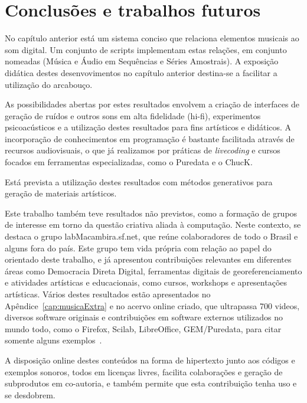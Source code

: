 \chapter{Conclusões e trabalhos futuros} %
\label{cap:conclusao}

No capítulo anterior está um sistema conciso
que relaciona elementos musicais ao som digital. Um conjunto
de scripts implementam estas relações, em conjunto nomeadas \massa (Música
e Áudio em Sequências e Séries Amostrais). 
A exposição didática destes desenvovimentos no
capítulo anterior destina-se a facilitar a utilização
do arcabouço.

As possibilidades abertas por estes resultados envolvem a criação de interfaces de geração de ruídos e outros sons em alta fidelidade (hi-fi), experimentos psicoacústicos e a utilização destes resultados para fins artísticos e didáticos. A incorporação de conhecimentos
em programação é bastante facilitada através de recursos audiovisuais, o que já realizamos por práticas de \emph{livecoding} e cursos focados em ferramentas especializadas, como o Puredata e o ChucK.

Está prevista a utilização destes resultados com
métodos generativos para geração de materiais artísticos.


Este trabalho também teve resultados não previstos, como a formação de grupos
de interesse em torno da questão criativa aliada à computação.
Neste contexto, se destaca o grupo
labMacambira.sf.net, que reúne colaboradores de todo o Brasil e alguns fora do país.
Este grupo tem vida própria com relação ao papel do orientado
deste trabalho, e já apresentou contribuições relevantes em diferentes áreas
como Democracia Direta Digital, ferramentas digitais de georeferenciamento e
atividades artísticas e educacionais, como cursos, workshops e apresentações artísticas. Vários destes resultados estão apresentados no Apêndice~\ref{cap:musicaExtra} e no acervo online criado, que ultrapassa 700 videos, diversos software originais e contribuições em software externos utilizados no mundo todo, como o Firefox, Scilab, LibreOffice, GEM/Puredata, para citar somente alguns exemplos~\cite{siteLM,wikiLM,vimeoLM}.

A disposição online destes conteúdos na forma de hipertexto junto aos códigos e exemplos sonoros, todos em licenças livres, facilita colaborações e geração de subprodutos em co-autoria, e também permite que esta contribuição tenha uso e se desdobrem.







